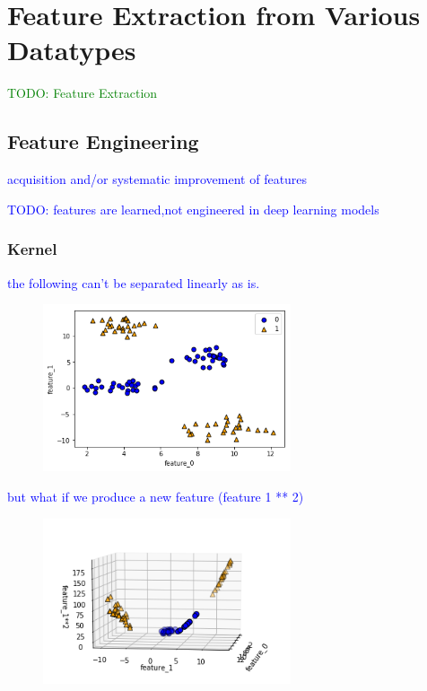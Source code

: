 \section{Feature Extraction from Various Datatypes}

\textcolor{green}{TODO: Feature Extraction}

\subsection{Feature Engineering}

\textcolor{blue}{acquisition and/or systematic improvement of features}

\textcolor{blue}{TODO: features are learned,not engineered in deep learning models}

\subsubsection{Kernel}

\textcolor{blue}{the following can't be separated linearly as is.}

\begin{figure}
\centering
\includegraphics[width=0.65\textwidth]{./sync_imgs/kernelized/2class4clust/2dimg.png}
\label{fig:kernelized_2class4clust_2dimg}
\end{figure}

\textcolor{blue}{but what if we produce a new feature (feature 1 ** 2)}

\begin{figure}
\centering
\includegraphics[width=0.65\textwidth]{./sync_imgs/kernelized/2class4clust/3dimg.png}
\label{fig:kernelized_2class4clust_3dimg}
\end{figure}



